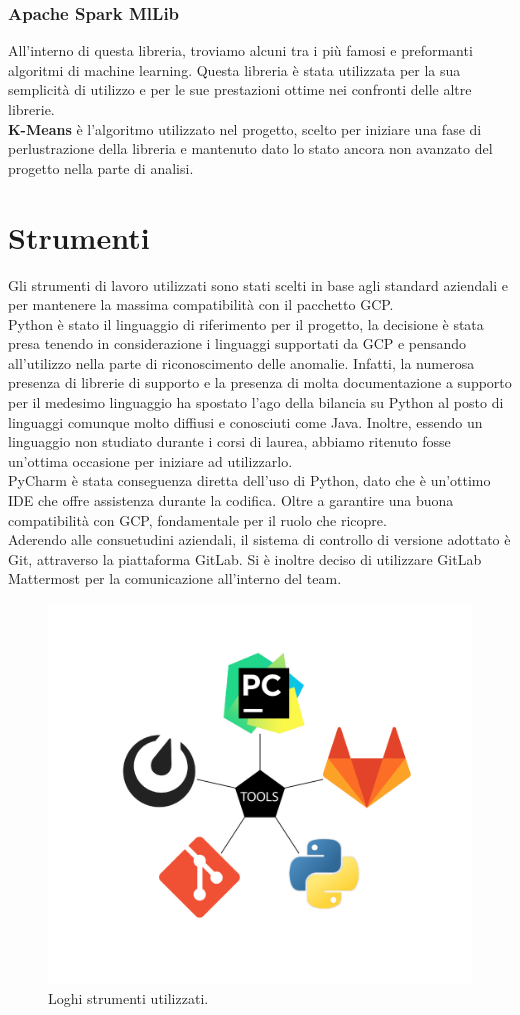 \subsubsection{Apache Spark MlLib}
All'interno di questa libreria, troviamo alcuni tra i più famosi e preformanti algoritmi di machine learning. Questa libreria è stata utilizzata per la sua semplicità di utilizzo e per le sue prestazioni ottime nei confronti delle altre librerie.
\\
\textbf{K-Means} \cite{k-means} è  l'algoritmo utilizzato nel progetto, scelto per iniziare una fase di perlustrazione della libreria e mantenuto dato lo stato ancora non avanzato del progetto nella parte di analisi.
\section{Strumenti}
Gli strumenti di lavoro utilizzati sono stati scelti in base agli standard aziendali e per mantenere la massima compatibilità con il pacchetto GCP.
\\
Python è stato il linguaggio di riferimento per il progetto, la decisione è stata presa tenendo in considerazione i linguaggi supportati da GCP e pensando all'utilizzo nella parte di riconoscimento delle anomalie. Infatti, la numerosa presenza di librerie di supporto e la presenza di molta documentazione a supporto per il medesimo linguaggio ha spostato l'ago della bilancia su Python al posto di linguaggi comunque molto diffiusi e conosciuti come Java. Inoltre, essendo un linguaggio non studiato durante i corsi di laurea, abbiamo ritenuto fosse un'ottima occasione per iniziare ad utilizzarlo.
\\
PyCharm è stata conseguenza diretta dell'uso di Python, dato che è un'ottimo IDE che offre assistenza durante la codifica. Oltre a garantire una buona compatibilità con GCP, fondamentale per il ruolo che ricopre.
\\
Aderendo alle consuetudini aziendali, il sistema di controllo di versione adottato è Git, attraverso la piattaforma GitLab. Si è inoltre deciso di utilizzare GitLab Mattermost per la comunicazione all'interno del team.

\begin{figure}[h!]
	\centering
	\includegraphics[scale=0.4]{figures/pentagono_grande-03}
	\caption[Loghi strumenti utilizzati	.]{Loghi strumenti utilizzati.
		\label{fig:loghi}}
\end{figure}	